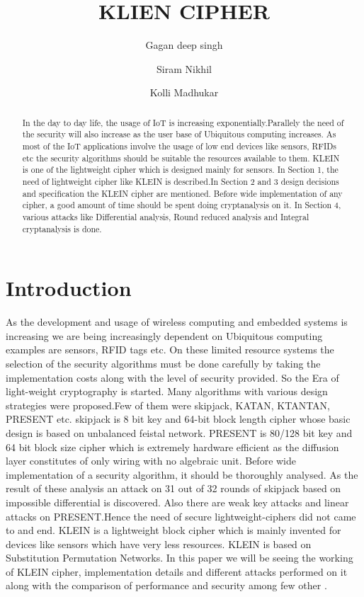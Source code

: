 \documentclass[preprint]{transcrypto}
\author{Gagan deep singh\inst{1} \and Siram Nikhil\inst{1} \and Kolli Madhukar\inst{1}}
\institute{
 Indian Institute of Technology, Bhilai, India 
}
\title{KLIEN CIPHER}
\begin{document}
\maketitle


\begin{abstract}
In the day to day life, the usage of IoT is increasing exponentially.Parallely the need of the security will also increase as the user base of Ubiquitous computing increases. As most of the IoT applications involve the usage of low end devices like sensors, RFIDs etc the security algorithms should be suitable the resources available to them. KLEIN is one of the lightweight cipher which is designed mainly for sensors. In Section 1, the need of lightweight cipher like KLEIN is described.In Section 2 and 3 design decisions and specification the KLEIN cipher are mentioned. Before wide implementation of any cipher, a good amount of time should be spent doing cryptanalysis on it. In Section 4, various attacks like Differential analysis, Round reduced analysis and Integral cryptanalysis is done.
\end{abstract}


\section{Introduction}
As the development and usage of wireless computing and embedded systems is increasing we are being increasingly dependent on Ubiquitous computing examples are sensors, RFID tags etc. On these limited resource systems the selection of the security algorithms must be done carefully by taking the implementation costs along with the level of security provided. So the Era of light-weight cryptography is started. Many algorithms with various design strategies were proposed.Few of them were skipjack, KATAN\cite{KATAN}, KTANTAN\cite{KATAN}, PRESENT\cite{PRESENT} etc. skipjack is 8 bit key and 64-bit block length cipher whose basic design is based on unbalanced feistal network. PRESENT is 80/128 bit key and 64 bit block size cipher  which is extremely hardware efficient as the diffusion layer constitutes of only wiring with no algebraic unit.
Before wide implementation of a security algorithm, it should be thoroughly analysed. As the result of these analysis an attack on 31 out of 32 rounds of skipjack based on impossible differential is discovered. Also there are weak key attacks and linear attacks on PRESENT.Hence the need of secure lightweight-ciphers did not came to and end. KLEIN is a lightweight block cipher which is mainly invented for devices like sensors which have very less resources. KLEIN \cite{KLEIN} is based on Substitution Permutation Networks. In this paper we will be seeing the working of KLEIN cipher, implementation details and different attacks performed on it along with the comparison of performance and security among few other .
\end{document}
